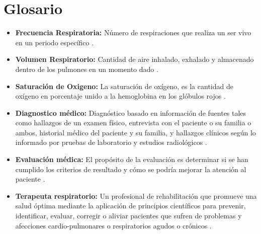 \documentclass[12pt]{article}
\begin{document}


\section*{Glosario}
\begin{itemize}
\item \textbf{Frecuencia Respiratoria:} Número de respiraciones que realiza un ser vivo en un periodo específico \cite{1}. 
\item \textbf{Volumen Respiratorio:} Cantidad de aire inhalado, exhalado y almacenado dentro de los pulmones en un momento dado \cite{2}.
\item \textbf{Saturación de Oxigeno:} La saturación de oxígeno, es la cantidad de oxígeno en porcentaje unido a la hemoglobina en los glóbulos rojos \cite{3}.
\item \textbf{Diagnostico médico:} Diagnóstico basado en información de fuentes tales como hallazgos de un examen físico, entrevista con el paciente o su familia o ambos, historial médico del paciente y su familia, y hallazgos clínicos según lo informado por pruebas de laboratorio y estudios radiológicos \cite{4}.
\item \textbf{Evaluación médica:} El propósito de la evaluación es determinar si se han cumplido los criterios de resultado y cómo se podría mejorar la atención al paciente \cite{4}.
\item \textbf{Terapeuta respiratorio:} Un profesional de rehabilitación que promueve una salud óptima mediante la aplicación de principios científicos para prevenir, identificar, evaluar, corregir o aliviar pacientes que sufren de problemas y afecciones cardio-pulmonares o respiratorios agudos o crónicos \cite{4}.


\end{itemize}
\newpage

\tableofcontents
{}

\end{document}
